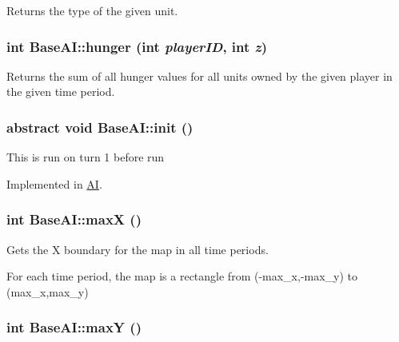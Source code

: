 Returns the type of the given unit. \hypertarget{classBaseAI_e1677c15b8b022dd7335eeb84b57b30f}{
\subsubsection[{hunger}]{\setlength{\rightskip}{0pt plus 5cm}int BaseAI::hunger (int {\em playerID}, \/  int {\em z})}}
\label{classBaseAI_e1677c15b8b022dd7335eeb84b57b30f}


Returns the sum of all hunger values for all units owned by the given player in the given time period. \hypertarget{classBaseAI_71b49f4ca248bfd32a9f9557cb6d494a}{
\subsubsection[{init}]{\setlength{\rightskip}{0pt plus 5cm}abstract void BaseAI::init ()}}
\label{classBaseAI_71b49f4ca248bfd32a9f9557cb6d494a}


This is run on turn 1 before run 

Implemented in \hyperlink{classAI_8c8e3a635791abaa61585357e6a25f63}{AI}.\hypertarget{classBaseAI_e7574c0a95bc4431f83078c0074b1eec}{
\subsubsection[{maxX}]{\setlength{\rightskip}{0pt plus 5cm}int BaseAI::maxX ()}}
\label{classBaseAI_e7574c0a95bc4431f83078c0074b1eec}


Gets the X boundary for the map in all time periods.

For each time period, the map is a rectangle from (-max\_\-x,-max\_\-y) to (max\_\-x,max\_\-y) \hypertarget{classBaseAI_68f5dfd6450be2649c8c26481ba7c0a5}{
\subsubsection[{maxY}]{\setlength{\rightskip}{0pt plus 5cm}int BaseAI::maxY ()}}
\label{classBaseAI_68f5dfd6450be2649c8c26481ba7c0a5}


